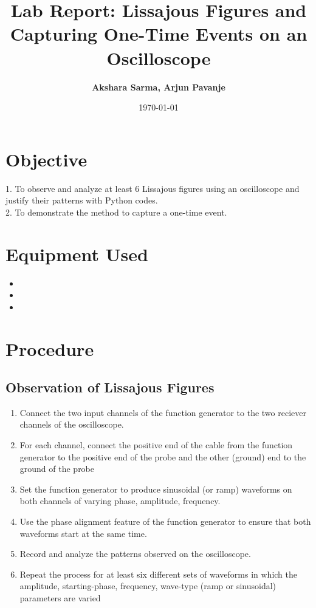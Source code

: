 \documentclass[a4paper,12pt]{article}
\title{Lab Report: Lissajous Figures and Capturing One-Time Events on an Oscilloscope}
\author{\textbf{Akshara Sarma, Arjun Pavanje}}
\date{\today}
\begin{document}
\maketitle

\section*{Objective}
1. To observe and analyze at least 6 Lissajous figures using an oscilloscope and justify their patterns with Python codes.\\
2. To demonstrate the method to capture a one-time event.\\

\section*{Equipment Used}
\begin{itemize}
\item {}
    \item {}
    \item {}
\end{itemize}

\section*{Procedure}

\subsection*{Observation of Lissajous Figures}
\begin{enumerate}
\item Connect the two input channels of the function generator to the two reciever channels of the oscilloscope.\\
\item For each channel, connect the positive end of the cable from the function generator to the positive end of the probe and the other (ground) end to the ground of the probe\\
\item Set the function generator to produce sinusoidal (or ramp) waveforms on both channels of varying phase, amplitude, frequency.\\
\item Use the phase alignment feature of the function generator to ensure that both waveforms start at the same time.\\
\item Record and analyze the patterns observed on the oscilloscope.\\
\item Repeat the process for at least six different sets of waveforms in which the amplitude, starting-phase, frequency, wave-type (ramp or sinusoidal) parameters are varied\\
\end{enumerate}
\end{document}
